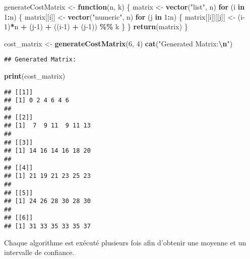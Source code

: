 \documentclass[
]{article}
\newenvironment{Shaded}{\begin{snugshade}}{\end{snugshade}}
\newcommand{\ControlFlowTok}[1]{\textcolor[rgb]{0.13,0.29,0.53}{\textbf{#1}}}
\newcommand{\DecValTok}[1]{\textcolor[rgb]{0.00,0.00,0.81}{#1}}
\newcommand{\FunctionTok}[1]{\textcolor[rgb]{0.13,0.29,0.53}{\textbf{#1}}}
\newcommand{\NormalTok}[1]{#1}
\newcommand{\OtherTok}[1]{\textcolor[rgb]{0.56,0.35,0.01}{#1}}
\newcommand{\SpecialCharTok}[1]{\textcolor[rgb]{0.81,0.36,0.00}{\textbf{#1}}}
\newcommand{\StringTok}[1]{\textcolor[rgb]{0.31,0.60,0.02}{#1}}
\begin{document}
\begin{Shaded}
\begin{Highlighting}[]
\NormalTok{generateCostMatrix }\OtherTok{\textless{}{-}} \ControlFlowTok{function}\NormalTok{(n, k) \{}
\NormalTok{  matrix }\OtherTok{\textless{}{-}} \FunctionTok{vector}\NormalTok{(}\StringTok{"list"}\NormalTok{, n)}
  \ControlFlowTok{for}\NormalTok{ (i }\ControlFlowTok{in} \DecValTok{1}\SpecialCharTok{:}\NormalTok{n) \{}
\NormalTok{    matrix[[i]] }\OtherTok{\textless{}{-}} \FunctionTok{vector}\NormalTok{(}\StringTok{"numeric"}\NormalTok{, n)}
    \ControlFlowTok{for}\NormalTok{ (j }\ControlFlowTok{in} \DecValTok{1}\SpecialCharTok{:}\NormalTok{n) \{}
\NormalTok{      matrix[[i]][[j]] }\OtherTok{\textless{}{-}}\NormalTok{ (i}\DecValTok{{-}1}\NormalTok{)}\SpecialCharTok{*}\NormalTok{n }\SpecialCharTok{+}\NormalTok{ (j}\DecValTok{{-}1}\NormalTok{) }\SpecialCharTok{+}\NormalTok{ ((i}\DecValTok{{-}1}\NormalTok{) }\SpecialCharTok{+}\NormalTok{ (j}\DecValTok{{-}1}\NormalTok{)) }\SpecialCharTok{\%\%}\NormalTok{ k}
\NormalTok{    \}}
\NormalTok{  \}}
  \FunctionTok{return}\NormalTok{(matrix)}
\NormalTok{\}}

\NormalTok{cost\_matrix }\OtherTok{\textless{}{-}} \FunctionTok{generateCostMatrix}\NormalTok{(}\DecValTok{6}\NormalTok{, }\DecValTok{4}\NormalTok{)}
\FunctionTok{cat}\NormalTok{(}\StringTok{"Generated Matrix:}\SpecialCharTok{\textbackslash{}n}\StringTok{"}\NormalTok{)}
\end{Highlighting}
\end{Shaded}

\begin{verbatim}
## Generated Matrix:
\end{verbatim}

\begin{Shaded}
\begin{Highlighting}[]
\FunctionTok{print}\NormalTok{(cost\_matrix)}
\end{Highlighting}
\end{Shaded}

\begin{verbatim}
## [[1]]
## [1] 0 2 4 6 4 6
## 
## [[2]]
## [1]  7  9 11  9 11 13
## 
## [[3]]
## [1] 14 16 14 16 18 20
## 
## [[4]]
## [1] 21 19 21 23 25 23
## 
## [[5]]
## [1] 24 26 28 30 28 30
## 
## [[6]]
## [1] 31 33 35 33 35 37
\end{verbatim}

Chaque algorithme est exécuté plusieurs fois afin d'obtenir une moyenne
et un intervalle de confiance.
\end{document}
